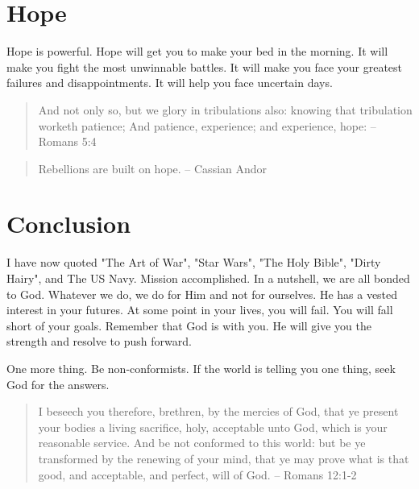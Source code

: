\documentclass[11pt,a4paper,sans]{article}
\begin{document}
\section{Hope}

Hope is powerful. Hope will get you to make your bed in the morning. It will make you fight the most unwinnable battles. It will make you face your greatest failures and disappointments. It will help you face uncertain days. 

\begin{quote}
    And not only so, but we glory in tribulations also: knowing that tribulation worketh patience; And patience, experience; and experience,  hope: -- Romans 5:4
\end{quote}

\begin{quote}
    Rebellions are built on hope. -- Cassian Andor
\end{quote}


\section{Conclusion}
I have now quoted "The Art of War", "Star Wars", "The Holy Bible", "Dirty Hairy", and The US Navy. Mission accomplished. In a nutshell, we are all bonded to God. Whatever we do, we do for Him and not for ourselves. He has a vested interest in your futures. At some point in your lives, you will fail. You will fall short of your goals. Remember that God is with you. He will give you the strength and resolve to push forward.

One more thing. Be non-conformists. If the world is telling you one thing, seek God for the answers.

\begin{quote}
  I beseech you therefore, brethren, by the mercies of God, that ye present your bodies a living sacrifice, holy, acceptable unto God, which is your reasonable service. And be not conformed to this world: but be ye transformed by the renewing of your mind, that ye may prove what is that good, and acceptable, and perfect, will of God.   -- Romans 12:1-2
\end{quote}
\end{document}
